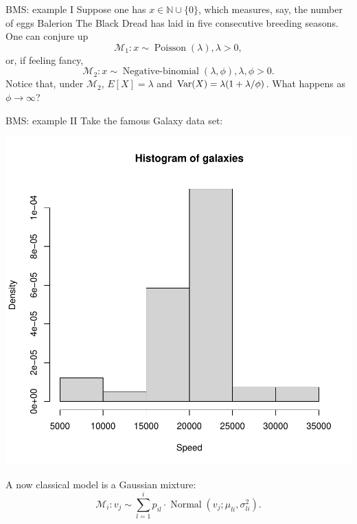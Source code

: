 \begin{frame}{BMS: example I}
Suppose one has $x \in \mathbb{N}\cup \{0\}$, which measures, say, the number of eggs Balerion The Black Dread has laid in five consecutive breeding seasons.
One can conjure up
\begin{equation*}
 \mathcal{M}_1 : x \sim \operatorname{Poisson}(\lambda), \lambda > 0,
\end{equation*}
or, if feeling fancy, 
\begin{equation*}
 \mathcal{M}_2 : x \sim \operatorname{Negative-binomial}(\lambda, \phi), \lambda, \phi > 0.
\end{equation*}
Notice that, under $\mathcal{M}_2$, $E[X] = \lambda$ and $\operatorname{Var}(X) = \lambda ( 1 + \lambda/\phi)$.
What happens as $\phi \to \infty$?
\end{frame}
\begin{frame}{BMS: example II}
Take the famous Galaxy data set:
 \begin{center}
 \includegraphics[scale=0.3]{figures/galaxies.pdf}
\end{center}
A now classical model is a Gaussian mixture:
\begin{equation*}
 \mathcal{M}_i : v_j \sim \sum_{l=1}^i p_{il} \cdot \operatorname{Normal}(v_j; \mu_{li},\sigma^2_{li}). 
\end{equation*}
\end{frame}
